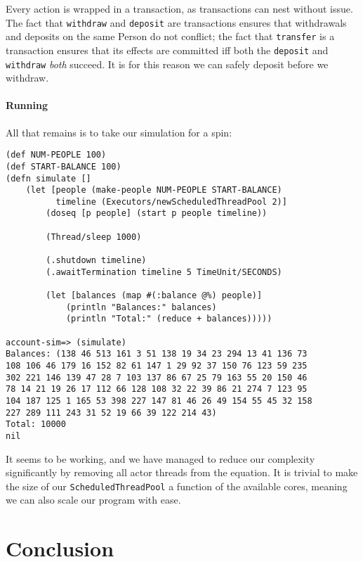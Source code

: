 \documentclass[a4paper,12pt]{kth-mag}
\begin{document}
Every action is wrapped in a transaction, as transactions can nest without issue. The fact that \texttt{withdraw} and \texttt{deposit} are transactions ensures that withdrawals and deposits on the same Person do not conflict; the fact that \texttt{transfer} is a transaction ensures that its effects are committed iff both the \texttt{deposit} and \texttt{withdraw} \textit{both} succeed. It is for this reason we can safely deposit before we withdraw.

\subsection{Running}

All that remains is to take our simulation for a spin:

\begin{listing}[H]
	\begin{verbatim}
(def NUM-PEOPLE 100)
(def START-BALANCE 100)
(defn simulate []
    (let [people (make-people NUM-PEOPLE START-BALANCE)
          timeline (Executors/newScheduledThreadPool 2)]
        (doseq [p people] (start p people timeline))
        
        (Thread/sleep 1000)
        
        (.shutdown timeline)
        (.awaitTermination timeline 5 TimeUnit/SECONDS)
        
        (let [balances (map #(:balance @%) people)]
            (println "Balances:" balances)
            (println "Total:" (reduce + balances)))))
            
account-sim=> (simulate)
Balances: (138 46 513 161 3 51 138 19 34 23 294 13 41 136 73 
108 106 46 179 16 152 82 61 147 1 29 92 37 150 76 123 59 235 
302 221 146 139 47 28 7 103 137 86 67 25 79 163 55 20 150 46 
78 14 21 19 26 17 112 66 128 108 32 22 39 86 21 274 7 123 95 
104 187 125 1 165 53 398 227 147 81 46 26 49 154 55 45 32 158 
227 289 111 243 31 52 19 66 39 122 214 43)
Total: 10000
nil
	\end{verbatim}
\end{listing}

It seems to be working, and we have managed to reduce our complexity significantly by removing all actor threads from the equation. It is trivial to make the size of our \texttt{ScheduledThreadPool} a function of the available cores, meaning we can also scale our program with ease.

\part{Conclusion}
\end{document}
